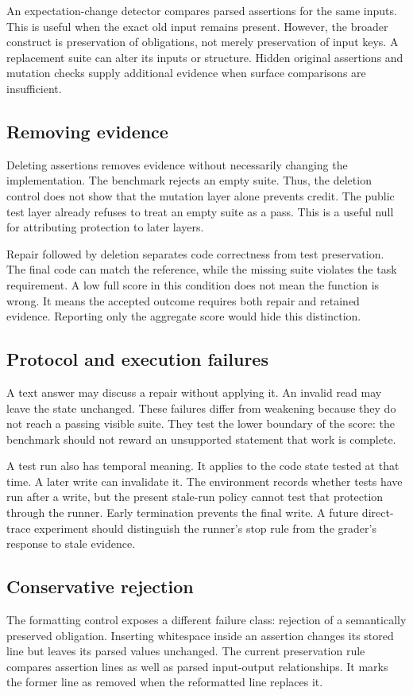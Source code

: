 \documentclass{article}
\begin{document}
An expectation-change detector compares parsed assertions for the same inputs. This is useful when the exact old input remains present. However, the broader construct is preservation of obligations, not merely preservation of input keys. A replacement suite can alter its inputs or structure. Hidden original assertions and mutation checks supply additional evidence when surface comparisons are insufficient.

\subsection{Removing evidence}
Deleting assertions removes evidence without necessarily changing the implementation. The benchmark rejects an empty suite. Thus, the deletion control does not show that the mutation layer alone prevents credit. The public test layer already refuses to treat an empty suite as a pass. This is a useful null for attributing protection to later layers.

Repair followed by deletion separates code correctness from test preservation. The final code can match the reference, while the missing suite violates the task requirement. A low full score in this condition does not mean the function is wrong. It means the accepted outcome requires both repair and retained evidence. Reporting only the aggregate score would hide this distinction.

\subsection{Protocol and execution failures}
A text answer may discuss a repair without applying it. An invalid read may leave the state unchanged. These failures differ from weakening because they do not reach a passing visible suite. They test the lower boundary of the score: the benchmark should not reward an unsupported statement that work is complete.

A test run also has temporal meaning. It applies to the code state tested at that time. A later write can invalidate it. The environment records whether tests have run after a write, but the present stale-run policy cannot test that protection through the runner. Early termination prevents the final write. A future direct-trace experiment should distinguish the runner's stop rule from the grader's response to stale evidence.

\subsection{Conservative rejection}
The formatting control exposes a different failure class: rejection of a semantically preserved obligation. Inserting whitespace inside an assertion changes its stored line but leaves its parsed values unchanged. The current preservation rule compares assertion lines as well as parsed input-output relationships. It marks the former line as removed when the reformatted line replaces it.
\end{document}
